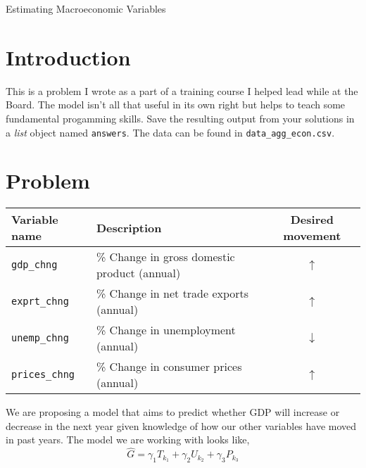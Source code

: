 \documentclass[11pt]{article}
\newcounter{prob} %
\begin{document}
\begin{center}
{\Large Estimating Macroeconomic Variables}
\bigskip
\end{center}

\section{Introduction}
\par
This is a problem I wrote as a part of a training course I helped lead while at the Board.
The model isn't all that useful in its own right but helps to teach some
fundamental progamming skills. Save the resulting output from your solutions in a \textit{list}
 object named \texttt{answers}. The data can be found in \texttt{data\_agg\_econ.csv}.

\section{Problem} \label{macro}
\begin{center}
\begin{tabular}{l l c}
\hline
\textbf{Variable name} & \textbf{Description} & \textbf{Desired movement}\\
\hline
\texttt{gdp\_chng} & \% Change in gross domestic product (annual) & $\uparrow$ \\
\texttt{exprt\_chng} & \% Change in net trade exports (annual) & $\uparrow$ \\
\texttt{unemp\_chng} & \% Change in unemployment (annual) & $\downarrow$ \\
\texttt{prices\_chng} & \% Change in consumer prices (annual) & $\uparrow$
\end{tabular}
\end{center}
We are proposing a model that aims to predict whether GDP will increase or decrease in the next year given knowledge of how our other variables have moved in past years. The model we are working with looks like,
\[
\hat{G} = \gamma_1 T_{k_1} + \gamma_2 U_{k_2} + \gamma_3 P_{k_3}
\]
\end{document}
